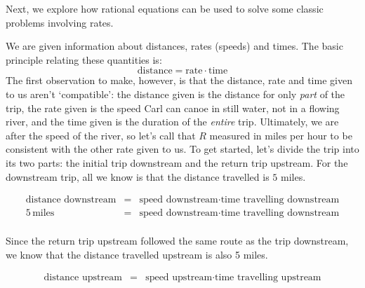 \medskip

Next, we explore how rational equations can be used to solve some classic problems involving rates.

\medskip

{
We are given information about distances, rates (speeds) and times.  The basic principle relating these quantities is: \[ \text{distance} = \text{rate} \cdot \text{time}\]  The first observation to make, however, is that the distance, rate and time given to us aren't `compatible':  the distance given is the distance for only \textit{part} of the trip,  the rate given is the speed Carl can canoe in still water, not in a flowing river, and  the time given is the duration of the \textit{entire} trip.  Ultimately, we are after the speed of the river, so let's call that $R$ measured in miles per hour to be consistent with the other rate given to us.  To get started, let's divide the trip into its two parts:  the initial trip downstream and the return trip upstream.  For the downstream trip, all we know is that the distance travelled is $5$ miles.

\[ \begin{array}{rcl}

\text{distance downstream} & = & \text{speed downstream} \cdot \text{time travelling downstream} \\

5 \, \text{miles} & = & \text{speed downstream} \cdot \text{time travelling downstream} \\ \end{array} \]

Since the return trip upstream followed the same route as the trip downstream, we know that the distance travelled upstream is also 5 miles.

\[ \begin{array}{rcl}

\text{distance upstream} & = & \text{speed upstream} \cdot \text{time travelling upstream} \\


\end{array}\]}
